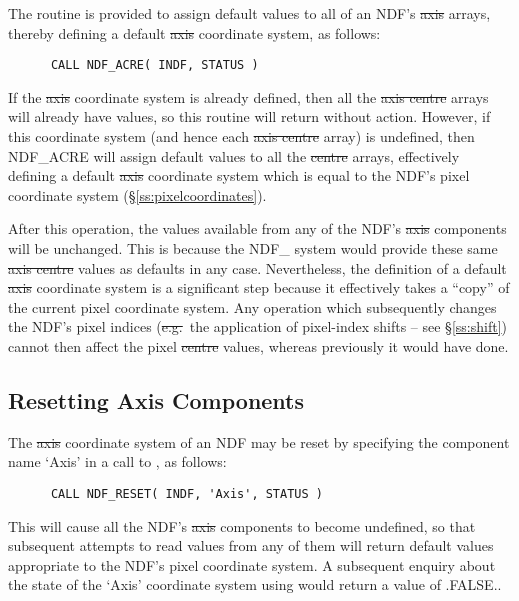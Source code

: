 The routine  is provided to assign default values to all of an
NDF's \st{axis\/} arrays, thereby defining a default \st{axis\/}
coordinate system, as follows: 

\small
\begin{verbatim}
      CALL NDF_ACRE( INDF, STATUS )
\end{verbatim}
\normalsize

If the \st{axis\/} coordinate system is already defined, then all the
\st{axis centre\/} arrays will already have values, so this routine
will return 
without action. 
However, if this coordinate system (and hence each \st{axis centre\/}
array) is undefined, then NDF\_ACRE will assign default values to all the
\st{centre\/} arrays, effectively defining a default \st{axis\/}
coordinate system which is equal to the NDF's pixel coordinate system
(\S\ref{ss:pixelcoordinates}). 

After this operation, the values available from any of the NDF's
\st{axis\/} components will be unchanged. 
This is because the NDF\_ system would provide these same \st{axis
centre\/} values as defaults in any case. 
Nevertheless, the definition of a default \st{axis\/} coordinate system is
a significant step because it effectively takes a ``copy'' of the current
pixel coordinate system. 
Any operation which subsequently changes the NDF's pixel indices
(\st{e.g.}\ the application of pixel-index shifts -- see
\S\ref{ss:shift}) cannot 
then affect the pixel \st{centre\/} values, whereas previously it would
have done. 

\subsection{Resetting Axis Components}

The \st{axis\/} coordinate system of an NDF may be reset by specifying the
component name `Axis' in a call to , as follows: 

\small
\begin{verbatim}
      CALL NDF_RESET( INDF, 'Axis', STATUS )
\end{verbatim}
\normalsize

This will cause all the NDF's \st{axis\/} components to become undefined,
so that subsequent attempts to read values from any of them will return
default values appropriate to the NDF's pixel coordinate system. 
A subsequent enquiry about the state of the `Axis' coordinate system using
 would return a value of .FALSE.. 


